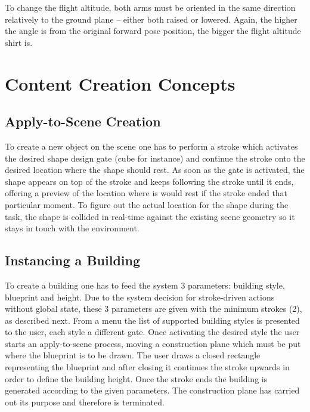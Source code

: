 To change the flight altitude, both arms must be oriented in the same direction relatively to the ground plane
-- either both raised or lowered. Again, the higher the angle is from the original forward pose position,
the bigger the flight altitude shirt is.



\section{Content Creation Concepts}

\subsection{Apply-to-Scene Creation}

To create a new object on the scene one has to perform a stroke which activates the desired shape design gate (cube for instance)
and continue the stroke onto the desired location where the shape should rest. As soon as the gate is activated, the shape appears
on top of the stroke and keeps following the stroke until it ends, offering a preview of the location where is would rest
if the stroke ended that particular moment.
To figure out the actual location for the shape during the task, the shape is collided in real-time against the
existing scene geometry so it stays in touch with the environment.



\subsection{Instancing a Building}

To create a building one has to feed the system 3 parameters: building style, blueprint and height.
Due to the system decision for stroke-driven actions without global state, these 3 parameters are given with the
minimum strokes (2), as described next.
From a menu the list of supported building styles is presented to the user, each style a different gate.
Once activating the desired style the user starts an apply-to-scene process, moving a construction plane which must
be put where the blueprint is to be drawn.
The user draws a closed rectangle representing the blueprint and after closing it continues
the stroke upwards in order to define the building height.
Once the stroke ends the building is generated according to the given parameters.
The construction plane has carried out its purpose and therefore is terminated.


